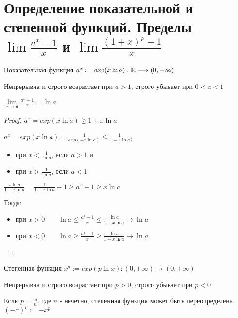 \section{Определение показательной и степенной функций. Пределы $\lim{\frac{a^x - 1}{x}}$ и $\lim{\frac{(1+x)^p - 1}{x}}$ \href{https://youtu.be/an3AiCY2hPE?t=5109}{\Walley}}
\begin{conj}
    Показательная функция \qquad $a^x := exp(x \ln{a}): \mathbb{R} \longrightarrow (0, +\infty)$
    
    Непрерывна и строго возрастает при $a > 1$, строго убывает при $0 < a < 1$
\end{conj}

\begin{theorem-non}
    $\lim\limits_{x \rightarrow 0}{\frac{a^x - 1}{x}} = \ln{a}$

    \begin{proof}
        $a^x = exp(x \ln{a}) \geqslant 1 + x \ln{a}$

        $a^x = exp(x \ln{a}) = \frac{1}{exp(-x\ln{a})} \leqslant \frac{1}{1 - x \ln{a}}$,
        \begin{itemize}
            \item[] при $x < \frac{1}{\ln{a}}$, если $a > 1$ и 
            \item[] при $x > \frac{1}{\ln{a}}$, если $a < 1$ 
        \end{itemize}

        $\frac{x\ln{a}}{1 - x \ln{a}} = \frac{1}{1 - x \ln{a}} - 1 \geqslant a^x - 1 \geqslant x\ln{a}$

        Тогда:
        \begin{itemize}
            \item[] при $x > 0 \qquad \ln{a} \leqslant \frac{a^x - 1}{x} \leqslant \frac{\ln{a}}{1 - x \ln{a}} \longrightarrow \ln{a}$
            \item[] при $x < 0 \qquad \ln{a} \geqslant \frac{a^x - 1}{x} \geqslant \frac{\ln{a}}{1 - x \ln{a}} \longrightarrow \ln{a}$
        \end{itemize}
    \end{proof}
\end{theorem-non}

\begin{conj}
        Степенная функция $x^p := exp(p \ln{x}) : (0, +\infty) \longrightarrow (0, +\infty)$

        Непрерывна и строго возрастает при $p > 0$, строго убывает при $p < 0$

        Если $p = \frac{m}{n}$, где $n$ - нечетно, степенная функция может быть переопределена. $(-x)^p := -x^p$
\end{conj}

